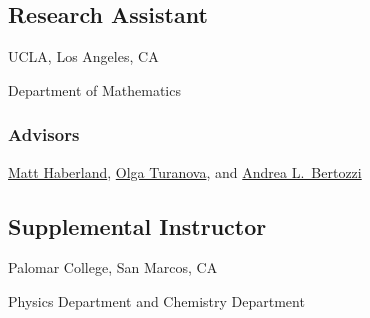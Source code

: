 \vspace*{\subsectionskip}

\subsection{Research Assistant}

\hspace*{\sectionwidth}UCLA, Los Angeles, CA

\hspace*{\sectionwidth}Department of Mathematics

\subsubsection{Advisors}
\href{https://brae.calpoly.edu/faculty-and-staff-haberland}{Matt Haberland}, \href{https://sites.google.com/msu.edu/turanova/home}{Olga Turanova}, and \href{http://www.math.ucla.edu/~bertozzi/}{Andrea L.\ Bertozzi}

\vspace*{\subsectionskip}

\subsection{Supplemental Instructor}

\hspace*{\sectionwidth}Palomar College, San Marcos, CA

\hspace*{\sectionwidth}Physics Department and Chemistry Department
